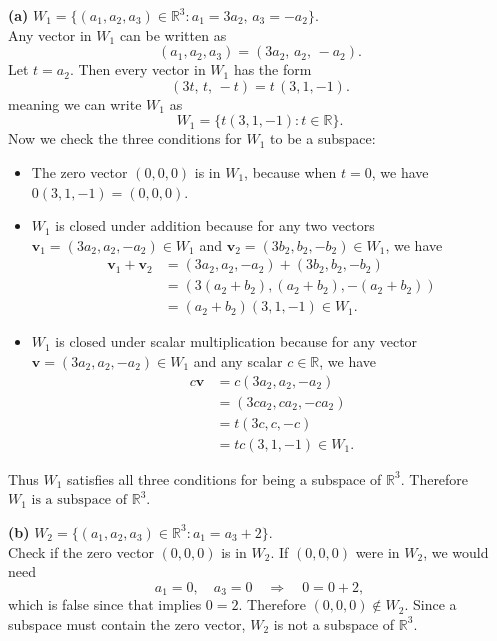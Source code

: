 \documentclass{article}
\begin{document}
\noindent
\textbf{(a)} $W_1 = \{(a_1,a_2,a_3) \in \mathbb{R}^3 : a_1 = 3a_2,\, a_3 = -a_2\}$. \\
\noindent
Any vector in $W_1$ can be written as
\[
(a_1, a_2, a_3) = (3a_2,\, a_2,\, -a_2).
\]
Let $t = a_2$. Then every vector in $W_1$ has the form
\[
(3t,\, t,\, -t) = t\,(3, 1, -1).
\]
meaning we can write $W_1$ as
\[
W_1 = \{t(3,1,-1) : t \in \mathbb{R}\}.
\]
Now we check the three conditions for $W_1$ to be a subspace:
\begin{itemize}
    \item The zero vector $(0,0,0)$ is in $W_1$, because when $t = 0$, we have $0(3,1,-1) = (0,0,0)$.
    \item $W_1$ is closed under addition because for any two vectors $\mathbf{v}_1 = (3a_2,a_2,-a_2) \in W_1$ and $\mathbf{v}_2 = (3b_2,b_2,-b_2) \in W_1$, we have
\begin{align*}
\mathbf{v}_1 + \mathbf{v}_2 &= (3a_2,a_2,-a_2) + (3b_2,b_2,-b_2) \\
                              &= (3(a_2+b_2),(a_2+b_2),-(a_2+b_2)) \\
                              &= (a_2 + b_2)(3,1,-1) \in W_1.
\end{align*}
    \item $W_1$ is closed under scalar multiplication because for any vector $\mathbf{v} = (3a_2,a_2,-a_2) \in W_1$ and any scalar $c \in \mathbb{R}$, we have
\begin{align*}
c\mathbf{v} &= c(3a_2,a_2,-a_2) \\
            &= (3ca_2,ca_2,-ca_2) \\
            &= t(3c,c,-c) \\
            &= tc(3,1,-1) \in W_1.
\end{align*}
\end{itemize}
Thus $W_1$ satisfies all three conditions for being a subspace of $\mathbb{R}^3$. Therefore $W_1 \text{ is a subspace of } \mathbb{R}^3$.

\bigskip

\noindent
\textbf{(b)} $W_2 = \{(a_1,a_2,a_3) \in \mathbb{R}^3 : a_1 = a_3 + 2\}$.\\
\noindent
Check if the zero vector $(0,0,0)$ is in $W_2$. If $(0,0,0)$ were in $W_2$, we would need
\[
a_1 = 0, \quad a_3 = 0 \quad \Longrightarrow \quad 0 = 0 + 2,
\]
which is false since that implies $0=2$. Therefore $(0,0,0) \notin W_2$. Since a subspace must contain the zero vector, $W_2$ is not a subspace of $\mathbb{R}^3$.

\bigskip
\end{document}
